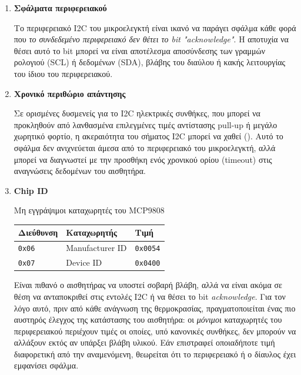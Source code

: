 \documentclass[a4paper,nobib]{tufte-book}
\begin{document}
\begin{enumerate}
	\item \textbf{Σφάλματα περιφερειακού}
	
	Το περιφερειακό \ac{I2C} του μικροελεγκτή είναι ικανό να παράγει σφάλμα κάθε φορά που \emph{το συνδεδεμένο περιφερειακό δεν θέτει το bit "acknowledge"}. Η αποτυχία να θέσει αυτό το bit μπορεί να είναι αποτέλεσμα αποσύνδεσης των γραμμών ρολογιού (\acs{SCL}) ή δεδομένων (\acs{SDA}), βλάβης του διαύλου ή κακής λειτουργίας του ίδιου του περιφερειακού.
	
	\item \textbf{Χρονικό περιθώριο απάντησης}
	
	Σε ορισμένες δυσμενείς για το \ac{I2C} ηλεκτρικές συνθήκες, που μπορεί να προκληθούν από λανθασμένα επιλεγμένες τιμές αντίστασης pull-up ή μεγάλο χωρητικό φορτίο, η ακεραιότητα του σήματος \ac{I2C} μπορεί να χαθεί (). Αυτό το σφάλμα δεν ανιχνεύεται άμεσα από το περιφερειακό του μικροελεγκτή, αλλά μπορεί να διαγνωστεί με την προσθήκη ενός χρονικού ορίου (timeout) στις αναγνώσεις δεδομένων του αισθητήρα.
	
	\item \textbf{Chip ID}
	
	\begin{margintable}
		\centering
		\caption{Μη εγγράψιμοι καταχωρητές του MCP9808}
		\label{tab:mcp9808readonly}
		\begin{tabularx}{\linewidth}{@{}lXl@{}}
			\toprule
			Διεύθυνση & Καταχωρητής & Τιμή \\ \midrule
			\texttt{0x06} & Manufacturer ID & \texttt{0x0054} \\
			\texttt{0x07} & Device ID & \texttt{0x0400} \\ \bottomrule
		\end{tabularx}
	\end{margintable}

	Είναι πιθανό ο αισθητήρας να υποστεί σοβαρή βλάβη, αλλά να είναι ακόμα σε θέση να ανταποκριθεί στις εντολές \ac{I2C} ή να θέσει το bit \emph{acknowledge}. Για τον λόγο αυτό, πριν από κάθε ανάγνωση της θερμοκρασίας, πραγματοποιείται ένας πιο αυστηρός έλεγχος της κατάστασης του αισθητήρα: οι \emph{μόνιμοι} καταχωρητές του περιφερειακού περιέχουν τιμές οι οποίες, υπό κανονικές συνθήκες, δεν μπορούν να αλλάξουν εκτός αν υπάρξει βλάβη υλικού. Εάν επιστραφεί οποιαδήποτε τιμή διαφορετική από την αναμενόμενη, θεωρείται ότι το περιφερειακό ή ο δίαυλος έχει εμφανίσει σφάλμα.
\end{enumerate}
\end{document}
